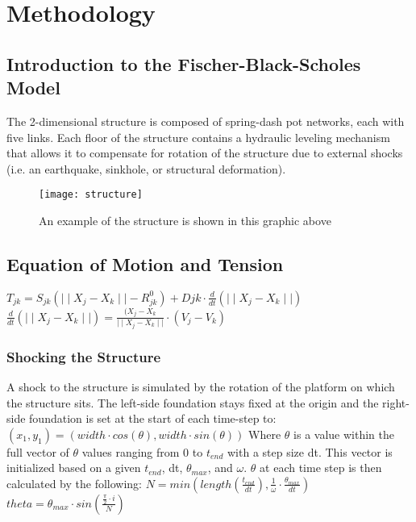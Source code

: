 \documentclass{article}
\begin{document}
\section{Methodology}

\subsection{Introduction to the Fischer-Black-Scholes Model}
\begin{flushleft}
The 2-dimensional structure is composed of spring-dash pot networks, each with five links. Each floor of the structure contains a hydraulic leveling mechanism that allows it to compensate for rotation of the structure due to external shocks (i.e. an earthquake, sinkhole, or structural deformation).
\end{flushleft} \newpage
\begin{figure}[!]
\texttt{[image: structure]}
\caption{An example of the structure is shown in this graphic above }
\centering
\end{figure}

\subsection{Equation of Motion and Tension}
\begin{flushleft}
$T_{jk}= S_{jk}(\mid\mid{X_j-X_k}\mid\mid-R^0_{jk}) + D{jk}\cdot \frac{d}{dt}(\mid\mid{X_j-X_k}\mid\mid)$
\newline\newline
$\frac{d}{dt}(\mid\mid{X_j-X_k}\mid\mid) = \frac{(X_j-X_k}{\mid\mid X_j - X_k\mid\mid}\cdot (V_j-V_k)$
\end{flushleft}

\subsubsection {Shocking the Structure}
\begin{flushleft} A shock to the structure is simulated by the rotation of the platform on which the structure sits. The left-side foundation stays fixed at the origin and the right-side foundation is set at the start of each time-step to: 
$(x_1,y_1) = (width \cdot cos(\theta), width \cdot sin(\theta))$
Where $\theta$ is a value within the full vector of $\theta$ values ranging from 0 to $t_{end}$ with a step size dt. This vector is initialized based on a given $t_{end}$, dt, $\theta_{max}$, and $\omega$. 
$\theta$ at each time step is then calculated by the following: 
\newline \newline
$N = min(length(\frac{t_{end}}{dt}),\frac{1}{\omega}\cdot \frac{\theta_{max}}{dt})$
\newline\newline
$theta = \theta_{max}\cdot sin(\frac{\frac{\pi}{2} \cdot i}{N})$
\end{flushleft}
\end{document}
